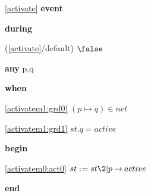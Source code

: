 \noindent \ref{activate}  \textbf{event}
\begin{block}
  \item   \textbf{during}
  \begin{block}
  \item[ (\ref{activate}/default) ]{$\false$} %
  \end{block}
  \item   \textbf{any} p,q
  \item   \textbf{when}
  \begin{block}
  \item[ \eqref{activatem1:grd0} ]{$(p \mapsto q) \in net $} %
  \item[ \eqref{activatem1:grd1} ]{$st.q = active $} %
  \end{block}
  \item   \textbf{begin}
  \begin{block}
  \item[ \eqref{activatem0:act0} ]{$st \bcmeq st \2| p \fun active $} %
  \end{block}
  \item   \textbf{end} \\
\end{block}
